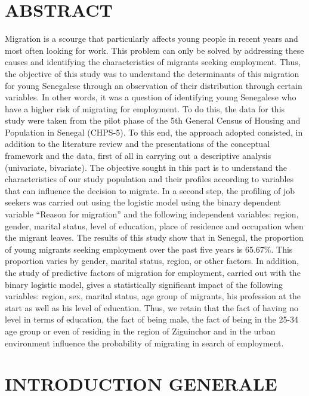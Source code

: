 \documentclass[
  letterpaper,
  DIV=11,
  numbers=noendperiod]{scrartcl}
\begin{document}
\hypertarget{abstract}{%
\section{ABSTRACT}\label{abstract}}

Migration is a scourge that particularly affects young people in recent
years and most often looking for work. This problem can only be solved
by addressing these causes and identifying the characteristics of
migrants seeking employment. Thus, the objective of this study was to
understand the determinants of this migration for young Senegalese
through an observation of their distribution through certain variables.
In other words, it was a question of identifying young Senegalese who
have a higher risk of migrating for employment. To do this, the data for
this study were taken from the pilot phase of the 5th General Census of
Housing and Population in Senegal (CHPS-5). To this end, the approach
adopted consisted, in addition to the literature review and the
presentations of the conceptual framework and the data, first of all in
carrying out a descriptive analysis (univariate, bivariate). The
objective sought in this part is to understand the characteristics of
our study population and their profiles according to variables that can
influence the decision to migrate. In a second step, the profiling of
job seekers was carried out using the logistic model using the binary
dependent variable ``Reason for migration'' and the following
independent variables: region, gender, marital status, level of
education, place of residence and occupation when the migrant leaves.
The results of this study show that in Senegal, the proportion of young
migrants seeking employment over the past five years is 65.67\%. This
proportion varies by gender, marital status, region, or other factors.
In addition, the study of predictive factors of migration for
employment, carried out with the binary logistic model, gives a
statistically significant impact of the following variables: region,
sex, marital status, age group of migrants, his profession at the start
as well as his level of education. Thus, we retain that the fact of
having no level in terms of education, the fact of being male, the fact
of being in the 25-34 age group or even of residing in the region of
Ziguinchor and in the urban environment influence the probability of
migrating in search of employment.

\newpage{}

\hypertarget{introduction-generale}{%
\section{INTRODUCTION GENERALE}\label{introduction-generale}}
\end{document}
